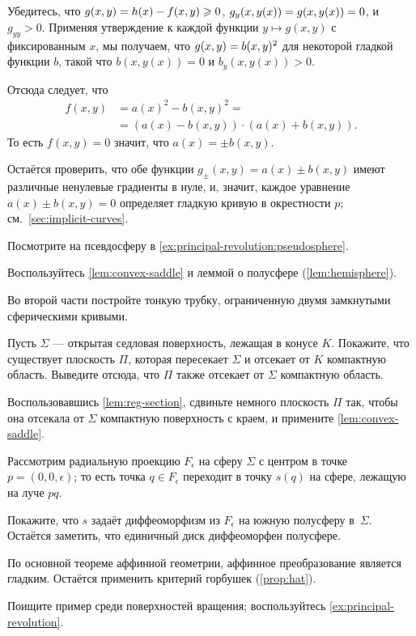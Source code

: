 \begin{multicols}{2}
Убедитесь, что $g(x,y)=h(x)-f(x,y)\z\ge 0$, $g_y(x,y(x))\z=g(x,y(x))\z=0$, и $g_{yy}>0$.
Применяя утверждение к каждой функции $y\mapsto g(x,y)$ с фиксированным $x$, мы получаем, что $g(x,y)\z=b(x,y)^2$ для некоторой гладкой функции $b$, такой что
$b(x,y(x))=0$ и $b_y(x,y(x))>0$.

Отсюда следует, что 
\begin{align*}
f(x,y)&=a(x)^2-b(x,y)^2=
\\
&=
(a(x)-b(x,y))\cdot (a(x)+b(x,y)).
\end{align*}
То есть $f(x,y)=0$ значит, что $a(x)=\pm b(x,y)$.

Остаётся проверить, что обе функции $g_\pm(x,y)=a(x)\pm b(x,y)$ имеют различные ненулевые градиенты в нуле, и, значит, каждое уравнение $a(x)\pm b(x,y) =0$ определяет гладкую кривую в окрестности $p$;
см.~\ref{sec:implicit-curves}.

Посмотрите на псевдосферу в \ref{ex:principal-revolution:pseudosphere}.

Воспользуйтесь \ref{lem:convex-saddle} и леммой о полусфере (\ref{lem:hemisphere}).

Во второй части постройте тонкую трубку, ограниченную двумя замкнутыми сферическими кривыми.

Пусть $\Sigma$ --- открытая седловая поверхность, лежащая в конусе $K$.
Покажите, что существует плоскость $\Pi$, которая пересекает $\Sigma$ и отсекает от $K$ компактную область.
Выведите отсюда, что $\Pi$ также отсекает от $\Sigma$ компактную область.

Воспользовавшись \ref{lem:reg-section}, сдвиньте немного плоскость $\Pi$ так, чтобы она отсекала от $\Sigma$ компактную поверхность с краем, и примените \ref{lem:convex-saddle}.

Рассмотрим радиальную проекцию $F_\epsilon$ на сферу $\Sigma$ с центром в точке $p=(0,0,\epsilon)$;
то есть точка $q\in F_\epsilon$ переходит в точку $s(q)$ на сфере, лежащую на луче $pq$.

Покажите, что $s$ задаёт диффеоморфизм из $F_\epsilon$ на южную полусферу в~$\Sigma$.
Остаётся заметить, что единичный диск диффеоморфен полусфере.

По основной теореме аффинной геометрии, аффинное преобразование является гладким.
Остаётся применить критерий горбушек (\ref{prop:hat}).

Поищите пример среди поверхностей вращения;
воспользуйтесь \ref{ex:principal-revolution}.


\end{multicols}
